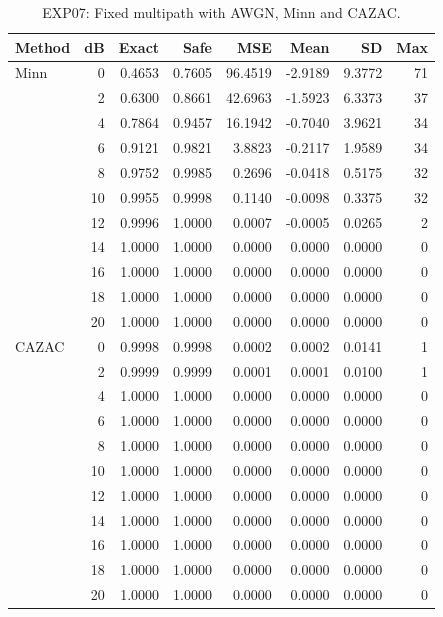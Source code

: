 \begin{table}[!p]
\centering
\caption{EXP07: Fixed multipath with AWGN, Minn and CAZAC.}
\label{app:exp07-1-1}
\small
\setlength{\tabcolsep}{3pt}
\renewcommand{\arraystretch}{1.05}
\begin{tabular}{lrrrrrrr}
\hline
Method & dB & Exact & Safe & MSE & Mean & SD & Max \\
\hline
Minn & 0 & 0.4653 & 0.7605 & 96.4519 & -2.9189 & 9.3772 & 71 \\
 & 2 & 0.6300 & 0.8661 & 42.6963 & -1.5923 & 6.3373 & 37 \\
 & 4 & 0.7864 & 0.9457 & 16.1942 & -0.7040 & 3.9621 & 34 \\
 & 6 & 0.9121 & 0.9821 & 3.8823 & -0.2117 & 1.9589 & 34 \\
 & 8 & 0.9752 & 0.9985 & 0.2696 & -0.0418 & 0.5175 & 32 \\
 & 10 & 0.9955 & 0.9998 & 0.1140 & -0.0098 & 0.3375 & 32 \\
 & 12 & 0.9996 & 1.0000 & 0.0007 & -0.0005 & 0.0265 & 2 \\
 & 14 & 1.0000 & 1.0000 & 0.0000 & 0.0000 & 0.0000 & 0 \\
 & 16 & 1.0000 & 1.0000 & 0.0000 & 0.0000 & 0.0000 & 0 \\
 & 18 & 1.0000 & 1.0000 & 0.0000 & 0.0000 & 0.0000 & 0 \\
 & 20 & 1.0000 & 1.0000 & 0.0000 & 0.0000 & 0.0000 & 0 \\
\hline
CAZAC & 0 & 0.9998 & 0.9998 & 0.0002 & 0.0002 & 0.0141 & 1 \\
 & 2 & 0.9999 & 0.9999 & 0.0001 & 0.0001 & 0.0100 & 1 \\
 & 4 & 1.0000 & 1.0000 & 0.0000 & 0.0000 & 0.0000 & 0 \\
 & 6 & 1.0000 & 1.0000 & 0.0000 & 0.0000 & 0.0000 & 0 \\
 & 8 & 1.0000 & 1.0000 & 0.0000 & 0.0000 & 0.0000 & 0 \\
 & 10 & 1.0000 & 1.0000 & 0.0000 & 0.0000 & 0.0000 & 0 \\
 & 12 & 1.0000 & 1.0000 & 0.0000 & 0.0000 & 0.0000 & 0 \\
 & 14 & 1.0000 & 1.0000 & 0.0000 & 0.0000 & 0.0000 & 0 \\
 & 16 & 1.0000 & 1.0000 & 0.0000 & 0.0000 & 0.0000 & 0 \\
 & 18 & 1.0000 & 1.0000 & 0.0000 & 0.0000 & 0.0000 & 0 \\
 & 20 & 1.0000 & 1.0000 & 0.0000 & 0.0000 & 0.0000 & 0 \\
\hline
\end{tabular}
\end{table}

